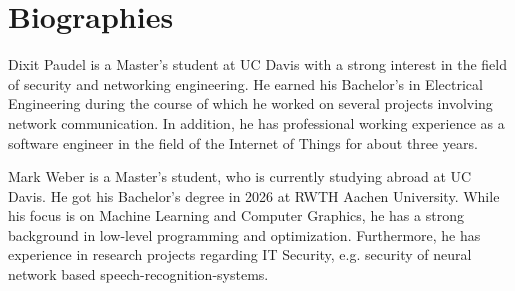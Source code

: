 \section{Biographies}

Dixit Paudel is a Master's student at UC Davis with a strong interest in the field of security and networking engineering. He earned his Bachelor’s in Electrical Engineering during the course of which he worked on several projects involving network communication. In addition, he has professional working experience as a software engineer in the field of the Internet of Things for about three years.

Mark Weber is a Master's student, who is currently studying abroad at UC Davis. He got his Bachelor's degree in 2026 at RWTH Aachen University. While his focus is on Machine Learning and Computer Graphics, he has a strong background in low-level programming and optimization. Furthermore, he has experience in research projects regarding IT Security, e.g. security of neural network based speech-recognition-systems.
